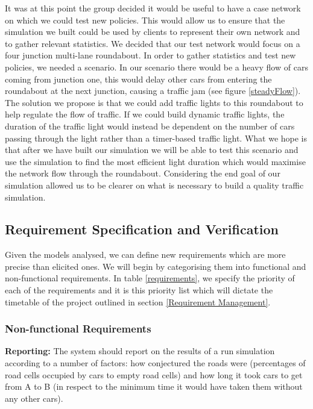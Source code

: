 \documentclass{article}
\begin{document}
	It was at this point the group decided it would be useful to have a case network on which we could test new policies. This would allow us to ensure that the simulation we built could be used by clients to represent their own network and to gather relevant statistics. We decided that our test network would focus on a four junction multi-lane roundabout. In order to gather statistics and test new policies, we needed a scenario. In our scenario there would be a heavy flow of cars coming from junction one, this would delay other cars from entering the roundabout at the next junction, causing a traffic jam (see figure \ref{steadyFlow}). The solution we propose is that we could add traffic lights to this roundabout to help regulate the flow of traffic. If we could build dynamic traffic lights, the duration of the traffic light would instead be dependent on the number of cars passing through the light rather than a timer-based traffic light. What we hope is that after we have built our simulation we will be able to test this scenario and use the simulation to find the most efficient light duration which would maximise the network flow through the roundabout. Considering the end goal of our simulation allowed us to be clearer on what is necessary to build a quality traffic simulation.  


	\subsection{Requirement Specification and Verification}
	
	Given the models analysed, we can define new requirements which are more precise than elicited ones. We will begin by categorising them into functional and non-functional requirements. In table \ref{requirements}, we specify the priority of each of the requirements and it is this priority list which will dictate the timetable of the project outlined in section \ref{Requirement Management}.\\
	
	\subsubsection{Non-functional Requirements}
	\textbf{Reporting:} The system should report on the results of a run simulation according to a number of factors: how conjectured the roads were (percentages of road cells occupied by cars to empty road cells) and how long it took cars to get from A to B (in respect to the minimum time it would have taken them without any other cars).\\
	
\end{document}
